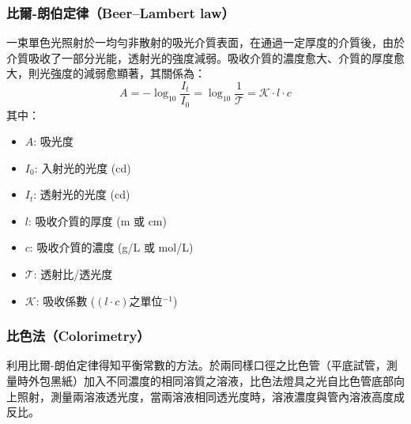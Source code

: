 \documentclass[a4paper,12pt]{article}
\begin{document}
\subsubsection{比爾-朗伯定律（Beer–Lambert law）}
一束單色光照射於一均勻非散射的吸光介質表面，在通過一定厚度的介質後，由於介質吸收了一部分光能，透射光的強度減弱。吸收介質的濃度愈大、介質的厚度愈大，則光強度的減弱愈顯著，其關係為：
\[A=-\log_{10}\frac{I_t}{I_0}=\log_{10}\frac{1}{\mathscr{T}}=\mathscr{K}\cdot l\cdot c\]
其中： 
\begin{itemize}
\item $A$: 吸光度
\item $I_0$: 入射光的光度 (cd)
\item $I_t$: 透射光的光度 (cd)
\item $l$: 吸收介質的厚度 (m 或 cm)
\item $c$: 吸收介質的濃度 (g/L 或 mol/L)
\item $\mathscr{T}$: 透射比/透光度
\item $\mathscr{K}$: 吸收係數 ($(l\cdot c)$之單位$^{-1}$)
\end{itemize}
\subsubsection{比色法（Colorimetry）}
利用比爾-朗伯定律得知平衡常數的方法。於兩同樣口徑之比色管（平底試管，測量時外包黑紙）加入不同濃度的相同溶質之溶液，比色法燈具之光自比色管底部向上照射，測量兩溶液透光度，當兩溶液相同透光度時，溶液濃度與管內溶液高度成反比。
\end{document}
